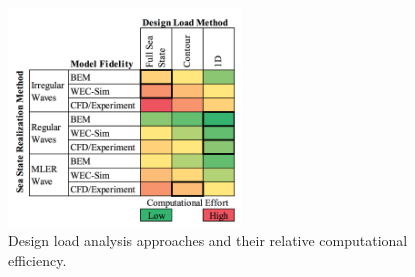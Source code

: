 \begin{figure}[!t]
\centering
\includegraphics[width=0.55\textwidth]{./Figures/DLM.png}
\caption{Design load analysis approaches and their relative computational efficiency.}
\label{fig:DLM}
\end{figure}
